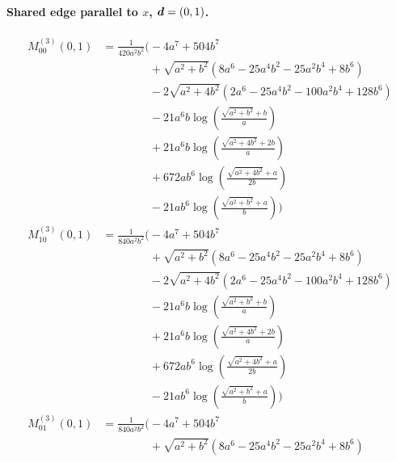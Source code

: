 \paragraph{Shared edge parallel to $x$, $\vb*{d}=(0,1)$.}
\begin{align*}
M^{(3)}_{00}(0,1) &= \frac{1}{420 a^{2} b^{2}}\Bigg(- 4 a^{7} + 504 b^{7}\\
&\phantom{{}=\frac{1}{420 a^{2} b^{2}}\Bigg(}+ \sqrt{a^{2} + b^{2}}\left(8 a^{6} - 25 a^{4} b^{2} - 25 a^{2} b^{4} + 8 b^{6}\right)\\
&\phantom{{}=\frac{1}{420 a^{2} b^{2}}\Bigg(}- 2 \sqrt{a^{2} + 4 b^{2}}\left(2 a^{6} - 25 a^{4} b^{2} - 100 a^{2} b^{4} + 128 b^{6}\right)\\
&\phantom{{}=\frac{1}{420 a^{2} b^{2}}\Bigg(}- 21 a^{6} b \log\left(\frac{\sqrt{a^{2} + b^{2}} + b}{a}\right)\\
&\phantom{{}=\frac{1}{420 a^{2} b^{2}}\Bigg(}+ 21 a^{6} b \log\left(\frac{\sqrt{a^{2} + 4 b^{2}} + 2 b}{a}\right)\\
&\phantom{{}=\frac{1}{420 a^{2} b^{2}}\Bigg(}+ 672 a b^{6} \log\left(\frac{\sqrt{a^{2} + 4 b^{2}} + a}{2 b}\right)\\
&\phantom{{}=\frac{1}{420 a^{2} b^{2}}\Bigg(}- 21 a b^{6} \log\left(\frac{\sqrt{a^{2} + b^{2}} + a}{b}\right)\Bigg)\\[1.2ex]
M^{(3)}_{10}(0,1) &= \frac{1}{840 a^{2} b^{2}}\Bigg(- 4 a^{7} + 504 b^{7}\\
&\phantom{{}=\frac{1}{840 a^{2} b^{2}}\Bigg(}+ \sqrt{a^{2} + b^{2}}\left(8 a^{6} - 25 a^{4} b^{2} - 25 a^{2} b^{4} + 8 b^{6}\right)\\
&\phantom{{}=\frac{1}{840 a^{2} b^{2}}\Bigg(}- 2 \sqrt{a^{2} + 4 b^{2}}\left(2 a^{6} - 25 a^{4} b^{2} - 100 a^{2} b^{4} + 128 b^{6}\right)\\
&\phantom{{}=\frac{1}{840 a^{2} b^{2}}\Bigg(}- 21 a^{6} b \log\left(\frac{\sqrt{a^{2} + b^{2}} + b}{a}\right)\\
&\phantom{{}=\frac{1}{840 a^{2} b^{2}}\Bigg(}+ 21 a^{6} b \log\left(\frac{\sqrt{a^{2} + 4 b^{2}} + 2 b}{a}\right)\\
&\phantom{{}=\frac{1}{840 a^{2} b^{2}}\Bigg(}+ 672 a b^{6} \log\left(\frac{\sqrt{a^{2} + 4 b^{2}} + a}{2 b}\right)\\
&\phantom{{}=\frac{1}{840 a^{2} b^{2}}\Bigg(}- 21 a b^{6} \log\left(\frac{\sqrt{a^{2} + b^{2}} + a}{b}\right)\Bigg)\\[1.2ex]
M^{(3)}_{01}(0,1) &= \frac{1}{840 a^{2} b^{2}}\Bigg(- 4 a^{7} + 504 b^{7}\\
&\phantom{{}=\frac{1}{840 a^{2} b^{2}}\Bigg(}+ \sqrt{a^{2} + b^{2}}\left(8 a^{6} - 25 a^{4} b^{2} - 25 a^{2} b^{4} + 8 b^{6}\right)\\

\end{align*}
